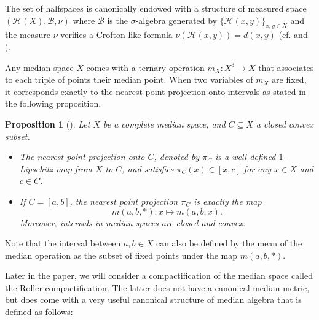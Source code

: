 \documentclass{amsart}
\numberwithin{equation}{section}
\newtheorem{prop}[thm]{Proposition}
\newcommand{\HH}{\mathcal{H}}     %
\newcommand{\BB}{\mathcal{B}}     %
\theoremstyle{definition}
\begin{document}
The set of halfspaces is canonically endowed with a structure of measured space $(\HH(X),\BB,\nu)$ where $\BB$ is the $\sigma$-algebra generated by $\{\HH(x,y)\}_{x,y\in X}$ and the measure $\nu$ verifies a Crofton like formula $\nu(\HH(x,y))=d(x,y)$ (cf. \cite{ChaDH_median} and \cite{Fior_median_property}).


\par
Any median space $X$ comes with a ternary operation $m_X:X^3\rightarrow X$ that associates to each triple of points their median point. When two variables of $m_X$ are fixed, it corresponds exactly to the nearest point projection onto intervals as stated in the following proposition.
\begin{prop}[\cite{ChaDH_median}] 
    Let $X$ be a complete median space, and $C\subseteq X$ a closed convex subset.
    \begin{itemize}
        \item The nearest point projection onto $C$, denoted by $\pi_C$ is a well-defined $1$-Lipschitz map from $X$ to $C$, and satisfies $\pi_C(x)\in[x,c]$ for any $x\in X$ and $c\in C$.
        \item If $C=[a,b]$, the nearest point projection $\pi_C$ is exactly the map $$m(a,b,*): x \mapsto m(a,b,x).$$ Moreover, intervals in median spaces are closed and convex.
    \end{itemize} 
\end{prop}
Note that the interval between $a,b\in X$ can also be defined by the mean of the median operation as the subset of fixed points under the map $m(a,b,*)$. \par Later in the paper, we will consider a compactification of the median space called the Roller compactification. The latter does not have a canonical median metric, but does come with a very useful canonical structure of median algebra that is defined as follows:




\end{document}
